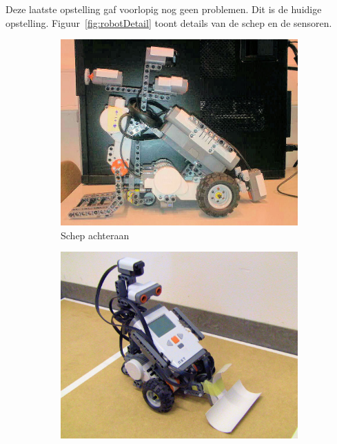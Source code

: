 \documentclass[eind]{penoverslag}
\begin{document}
Deze laatste opstelling gaf voorlopig nog geen problemen. Dit is de huidige opstelling. Figuur~\ref{fig:robotDetail} toont details van de schep en de sensoren.

\begin{figure}
\centering
	\begin{subfigure}[h]{0.325\textwidth}
	\centering
		\includegraphics[width=\textwidth]{robotOud1}
		\caption{Schep achteraan}
		\label{fig:robotOud1}
	\end{subfigure}
	\begin{subfigure}[h]{0.325\textwidth}
		\centering
		\includegraphics[width=\textwidth]{robotOud2}

\end{subfigure}
\end{figure}
\end{document}

